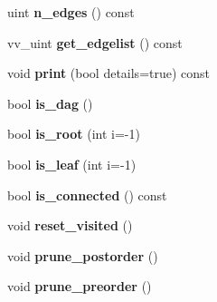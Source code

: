 \begin{DoxyCompactItemize}
\item 
uint {\bfseries n\+\_\+edges} () const \hypertarget{classTree_a055847ae7ad6387a32113a1fe24ca61b}{}\label{classTree_a055847ae7ad6387a32113a1fe24ca61b}

\item 
vv\+\_\+uint {\bfseries get\+\_\+edgelist} () const \hypertarget{classTree_a700fd8abdcb805f53999b2fb00fc2710}{}\label{classTree_a700fd8abdcb805f53999b2fb00fc2710}

\item 
void {\bfseries print} (bool details=true) const \hypertarget{classTree_afe757ac173ac177a0ebefd222a06eed5}{}\label{classTree_afe757ac173ac177a0ebefd222a06eed5}

\item 
bool {\bfseries is\+\_\+dag} ()\hypertarget{classTree_af793b391043a88ceea805b584efb982a}{}\label{classTree_af793b391043a88ceea805b584efb982a}

\item 
bool {\bfseries is\+\_\+root} (int i=-\/1)\hypertarget{classTree_ac7cc72373de46f73b747206d025854c0}{}\label{classTree_ac7cc72373de46f73b747206d025854c0}

\item 
bool {\bfseries is\+\_\+leaf} (int i=-\/1)\hypertarget{classTree_a47c36d92497bd98860e17937def7620c}{}\label{classTree_a47c36d92497bd98860e17937def7620c}

\item 
bool {\bfseries is\+\_\+connected} () const \hypertarget{classTree_a9f911acd648bbae87eaa018e61289903}{}\label{classTree_a9f911acd648bbae87eaa018e61289903}

\item 
void {\bfseries reset\+\_\+visited} ()\hypertarget{classTree_adb83bb19c14623ce57ac6d1b84b1c2ff}{}\label{classTree_adb83bb19c14623ce57ac6d1b84b1c2ff}

\item 
void {\bfseries prune\+\_\+postorder} ()\hypertarget{classTree_a7d465880d18acf79f3a772ea5412b0d7}{}\label{classTree_a7d465880d18acf79f3a772ea5412b0d7}

\item 
void {\bfseries prune\+\_\+preorder} ()\hypertarget{classTree_ac85bfb083b3856e65987e1d15885a61c}{}\label{classTree_ac85bfb083b3856e65987e1d15885a61c}

\end{DoxyCompactItemize}
